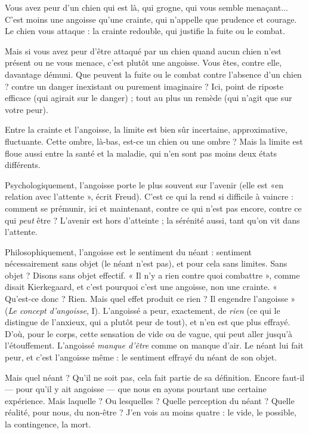 Vous avez peur d’un chien qui est là, qui grogne, qui vous semble menaçant...
C’est moins une angoisse qu’une crainte, qui n’appelle que prudence et
courage. Le chien vous attaque : la crainte redouble, qui justifie la fuite ou le
combat.

Mais si vous avez peur d’être attaqué par un chien quand aucun chien n’est
présent ou ne vous menace, c’est plutôt une angoisse. Vous êtes, contre elle,
davantage démuni. Que peuvent la fuite ou le combat contre l'absence d’un
chien ? contre un danger inexistant ou purement imaginaire ? Ici, point de
riposte efficace (qui agirait sur le danger) ; tout au plus un remède (qui n’agit
que sur votre peur).

Entre la crainte et l'angoisse, la limite est bien sûr incertaine, approximative,
fluctuante. Cette ombre, là-bas, est-ce un chien ou une ombre ? Mais la
limite est floue aussi entre la santé et la maladie, qui n’en sont pas moins deux
états différents.

Psychologiquement, l'angoisse porte le plus souvent sur l'avenir (elle est
«en relation avec l'attente », écrit Freud). C’est ce qui la rend si difficile à
vaincre : comment se prémunir, ici et maintenant, contre ce qui n'est pas
encore, contre ce qui {\it peut} être ? L'avenir est hors d’atteinte ; la sérénité aussi,
tant qu’on vit dans l'attente.

Philosophiquement, l’angoisse est le sentiment du néant : sentiment nécessairement
sans objet (le néant n’est pas), et pour cela sans limites. Sans objet ?
Disons sans objet effectif. « Il n’y a rien contre quoi combattre », comme disait
Kierkegaard, et c’est pourquoi c’est une angoisse, non une crainte. « Qu'est-ce
donc ? Rien. Mais quel effet produit ce rien ? Il engendre l'angoisse » ({\it Le
concept d'angoisse}, I). L’angoissé a peur, exactement, de {\it rien} (ce qui le distingue
de l’anxieux, qui a plutôt peur de tout), et n’en est que plus effrayé. D'où, pour
le corps, cette sensation de vide ou de vague, qui peut aller jusqu’à l’étouffement.
L’angoissé {\it manque d'être} comme on manque d’air. Le néant lui fait peur,
et c’est l’angoisse même : le sentiment effrayé du néant de son objet.

Mais quel néant ? Qu'il ne soit pas, cela fait partie de sa définition. Encore
faut-il — pour qu’il y ait angoisse — que nous en ayons pourtant une certaine
expérience. Mais laquelle ? Ou lesquelles ? Quelle perception du néant ? Quelle
réalité, pour nous, du non-être ? J'en vois au moins quatre : le vide, le possible,
la contingence, la mort.

